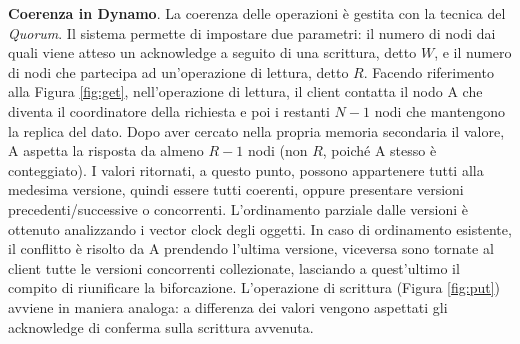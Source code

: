 \documentclass[twoside]{article}
\begin{document}
\begin{multicols}{2}
\textbf{Coerenza in Dynamo}. La coerenza delle operazioni è gestita con la tecnica del \emph{Quorum}\cite{bib:quorum}. Il sistema permette di impostare due parametri: il numero di nodi dai quali viene atteso un acknowledge a seguito di una scrittura, detto $W$, e il numero di nodi che partecipa ad un'operazione di lettura, detto $R$. Facendo riferimento alla Figura \ref{fig:get}, nell'operazione di lettura, il client contatta il nodo A che diventa il coordinatore della richiesta e poi i restanti $N-1$ nodi che mantengono la replica del dato. Dopo aver cercato nella propria memoria secondaria il valore, A aspetta la risposta da almeno $R-1$ nodi (non $R$, poiché A stesso è conteggiato). I valori ritornati, a questo punto, possono appartenere tutti alla medesima versione, quindi essere tutti coerenti, oppure presentare versioni precedenti/successive o concorrenti. L'ordinamento parziale dalle versioni è ottenuto analizzando i vector clock degli oggetti. In caso di ordinamento esistente, il conflitto è risolto da A prendendo l'ultima versione, viceversa sono tornate al client tutte le versioni concorrenti collezionate, lasciando a quest'ultimo il compito di riunificare la biforcazione. L'operazione di scrittura (Figura \ref{fig:put}) avviene in maniera analoga: a differenza dei valori vengono aspettati gli acknowledge di conferma sulla scrittura avvenuta.
\begin{figure}[t]
\centering
\begin{minipage}[b]{0.48\textwidth}
\end{minipage}
\end{figure}
\end{multicols}
\end{document}
